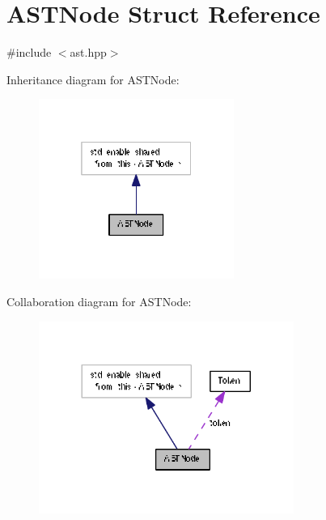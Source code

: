 \hypertarget{struct_a_s_t_node}{}\section{A\+S\+T\+Node Struct Reference}
\label{struct_a_s_t_node}


{\ttfamily \#include $<$ast.\+hpp$>$}



Inheritance diagram for A\+S\+T\+Node\+:\nopagebreak
\begin{figure}[H]
\begin{center}
\leavevmode
\includegraphics[width=181pt]{struct_a_s_t_node__inherit__graph}
\end{center}
\end{figure}


Collaboration diagram for A\+S\+T\+Node\+:\nopagebreak
\begin{figure}[H]
\begin{center}
\leavevmode
\includegraphics[width=236pt]{struct_a_s_t_node__coll__graph}
\end{center}
\end{figure}
